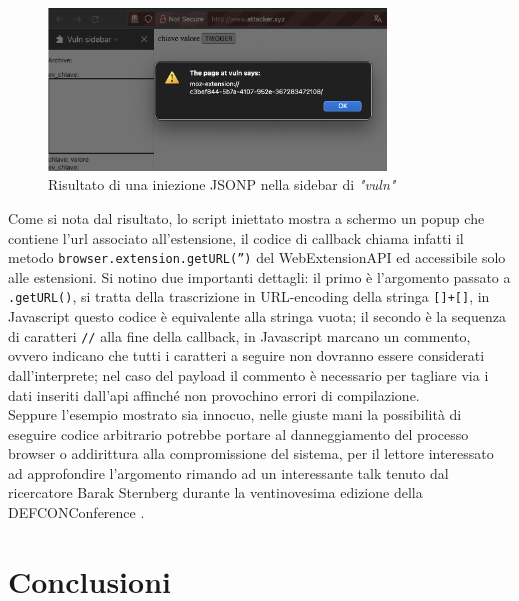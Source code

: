 \documentclass{sapthesis}
\newcommand{\code}[1]{\texttt{#1}}
\newcommand{\method}[1]{\code{.#1()}}
\newcommand{\vuln}{\textit{"vuln"}}
\newcommand{\JS}{Javascript}
\begin{document}
                \begin{figure}[ht]
                    \centering
                    \includegraphics[width=0.8\textwidth]{sidebar-jsonp-injection.png}
                    \caption{Risultato di una iniezione JSONP nella sidebar di \vuln{}}
                    \label{fig:sidebar-jsonp-injection}
                \end{figure}

                Come si nota dal risultato, lo script iniettato mostra a schermo un popup
                che contiene l'url associato all'estensione, il codice di callback chiama
                infatti il metodo \code{browser.extension.getURL('')} del WebExtensionAPI
                ed accessibile solo alle estensioni. Si notino due importanti dettagli:
                il primo è l'argomento passato a \method{getURL}, si tratta della trascrizione
                in URL-encoding della stringa \code{[]+[]}, in \JS{} questo codice è equivalente
                alla stringa vuota; il secondo è la sequenza di caratteri \code{//} alla fine della
                callback, in \JS{} marcano un commento, ovvero indicano che tutti i caratteri
                a seguire non dovranno essere considerati dall'interprete; nel caso del payload
                il commento è necessario per tagliare via i dati inseriti dall'api affinché
                non provochino errori di compilazione.\\

                Seppure l'esempio mostrato sia innocuo, nelle giuste mani la possibilità di
                eseguire codice arbitrario potrebbe portare al danneggiamento del processo
                browser o addirittura alla compromissione del sistema, per il lettore interessato
                ad approfondire l'argomento rimando ad un interessante talk tenuto dal ricercatore
                Barak Sternberg durante la ventinovesima edizione della DEFCONConference \cite{barak-sternberg-browser-extensions}.






\chapter{Conclusioni}
\label{cap:conclusioni}


\printbibliography
\end{document}
